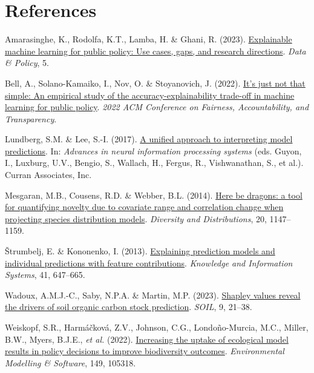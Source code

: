 \documentclass[
  letterpaper,
]{scrbook}
\newlength{\cslhangindent}
\newenvironment{CSLReferences}[2] %
 {\begin{list}{}{%
  \setlength{\itemindent}{0pt}
  \setlength{\leftmargin}{0pt}
  \setlength{\parsep}{0pt}
  \ifodd #1
   \setlength{\leftmargin}{\cslhangindent}
   \setlength{\itemindent}{-1\cslhangindent}
  \fi
  \setlength{\itemsep}{#2\baselineskip}}}
 {\end{list}}
\begin{document}
\label{appendices}
\cleardoublepage
{}
{}
\appendix

\section*{References}\label{bibliography-10}


\label{refs-10}
\begin{CSLReferences}{1}{0}
Amarasinghe, K., Rodolfa, K.T., Lamba, H. \& Ghani, R. (2023).
\href{https://doi.org/10.1017/dap.2023.2}{Explainable machine learning
for public policy: Use cases, gaps, and research directions}. \emph{Data
\& Policy}, 5.

Bell, A., Solano-Kamaiko, I., Nov, O. \& Stoyanovich, J. (2022).
\href{https://doi.org/10.1145/3531146.3533090}{It{'}s just not that
simple: An empirical study of the accuracy-explainability trade-off in
machine learning for public policy}. \emph{2022 ACM Conference on
Fairness, Accountability, and Transparency}.

Lundberg, S.M. \& Lee, S.-I. (2017).
\href{https://proceedings.neurips.cc/paper_files/paper/2017/file/8a20a8621978632d76c43dfd28b67767-Paper.pdf}{A
unified approach to interpreting model predictions}. In: \emph{Advances
in neural information processing systems} (eds. Guyon, I., Luxburg,
U.V., Bengio, S., Wallach, H., Fergus, R., Vishwanathan, S., et al.).
Curran Associates, Inc.

Mesgaran, M.B., Cousens, R.D. \& Webber, B.L. (2014).
\href{https://doi.org/10.1111/ddi.12209}{Here be dragons: a tool for
quantifying novelty due to covariate range and correlation change when
projecting species distribution models}. \emph{Diversity and
Distributions}, 20, 1147--1159.

Štrumbelj, E. \& Kononenko, I. (2013).
\href{https://doi.org/10.1007/s10115-013-0679-x}{Explaining prediction
models and individual predictions with feature contributions}.
\emph{Knowledge and Information Systems}, 41, 647--665.

Wadoux, A.M.J.-C., Saby, N.P.A. \& Martin, M.P. (2023).
\href{https://doi.org/10.5194/soil-9-21-2023}{Shapley values reveal the
drivers of soil organic carbon stock prediction}. \emph{SOIL}, 9,
21--38.

Weiskopf, S.R., Harmáčková, Z.V., Johnson, C.G., Londoño-Murcia, M.C.,
Miller, B.W., Myers, B.J.E., \emph{et al.} (2022).
\href{https://doi.org/10.1016/j.envsoft.2022.105318}{Increasing the
uptake of ecological model results in policy decisions to improve
biodiversity outcomes}. \emph{Environmental Modelling \& Software}, 149,
105318.

\end{CSLReferences}
\end{document}
